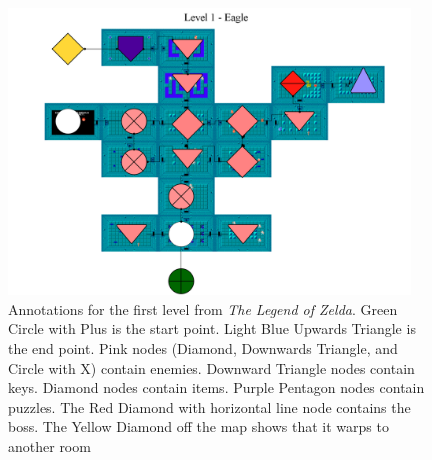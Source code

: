 \documentclass[12pt]{report}
\begin{document}
 \begin{figure}[htb!]
  \centering
    \includegraphics[width=0.95\textwidth]{figures/CopyOfLoz1.png}
  \caption{Annotations for the first level from \textit{The Legend of Zelda}. Green Circle with Plus is the start point. Light Blue Upwards Triangle is the end point. Pink nodes (Diamond, Downwards Triangle, and Circle with X) contain enemies. Downward Triangle nodes contain keys. Diamond nodes contain items. Purple Pentagon nodes contain puzzles. The Red Diamond with horizontal line node contains the boss. The Yellow Diamond off the map shows that it warps to another room}
  \label{fig:Copy_of_LoZ_1}
\end{figure}
\end{document}
